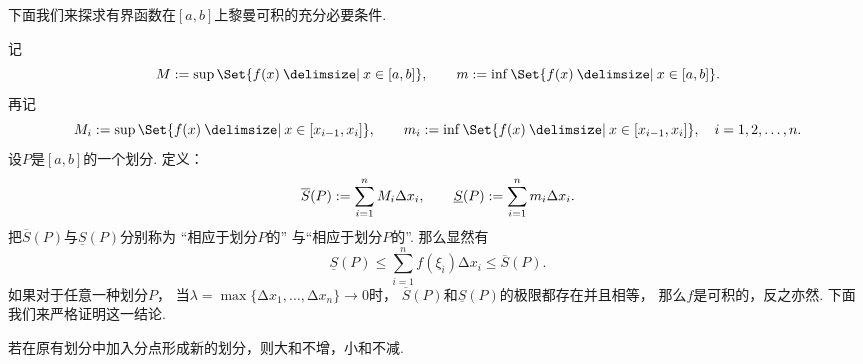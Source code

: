 下面我们来探求有界函数在\([a,b]\)上黎曼可积的充分必要条件.

记\begin{equation*}
	M \defeq \sup\Set{ f(x) \given x\in[a,b] }, \qquad
	m \defeq \inf\Set{ f(x) \given x\in[a,b] }.
\end{equation*}
再记\begin{equation*}
	M_i \defeq \sup\Set{ f(x) \given x\in[x_{i-1},x_i] }, \qquad
	m_i \defeq \inf\Set{ f(x) \given x\in[x_{i-1},x_i] },
	\quad i=1,2,\dotsc,n.
\end{equation*}
设\(P\)是\([a,b]\)的一个划分.
定义：\begin{equation*}
	\overline{S}(P) := \sum_{i=1}^n M_i \Delta x_i, \qquad
	\underline{S}(P) := \sum_{i=1}^n m_i \Delta x_i.
\end{equation*}
把\(\overline{S}(P)\)与\(\underline{S}(P)\)分别称为
“相应于划分\(P\)的”
与“相应于划分\(P\)的”.
那么显然有\begin{equation*}
	\underline{S}(P)
	\leq \sum_{i=1}^n f(\xi_i) \increment x_i
	\leq \overline{S}(P).
\end{equation*}
如果对于任意一种划分\(P\)，
当\(\lambda = \max\{\increment x_1,\dotsc,\increment x_n\} \to 0\)时，
\(\overline{S}(P)\)和\(\underline{S}(P)\)的极限都存在并且相等，
那么\(f\)是可积的，反之亦然.
下面我们来严格证明这一结论.

\begin{lemma}
若在原有划分中加入分点形成新的划分，则大和不增，小和不减.
\end{lemma}

